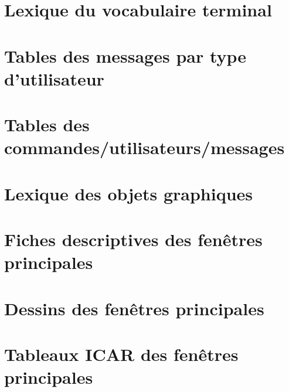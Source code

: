 \part{Lexique du vocabulaire terminal}

\part{Tables des messages par type d'utilisateur}

\part{Tables des commandes/utilisateurs/messages}

\part{Lexique des objets graphiques}
\part{Fiches descriptives des fenêtres principales}

\part{Dessins des fenêtres principales}
\part{Tableaux ICAR des fenêtres principales}

